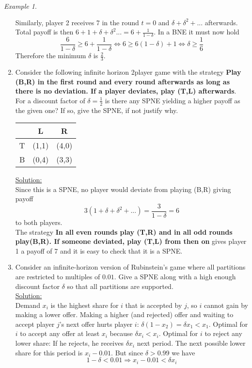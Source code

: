 \documentclass[a4paper, 12pt]{article}
\theoremstyle{plain}
\theoremstyle{definition}
\theoremstyle{lemma}
\theoremstyle{remark}
\theoremstyle{corollary}
\theoremstyle{example}
\newtheorem{example}[theorem]{Example}
\begin{document}
\begin{example}
\begin{enumerate}
			Similarly, player 2 receives 7 in the round $t=0$ and $\delta + \delta^2 + ...$ afterwards. Total payoff is then $6 + 1 + \delta + \delta^2 ... = 6 + \frac{1}{1-\delta}$. In a BNE it must now hold \[\frac{6}{1-\delta} \geq 6 + \frac{1}{1-\delta} \Leftrightarrow 6 \geq 6(1-\delta) + 1 \Leftrightarrow \delta \geq \frac{1}{6}\]
			Therefore the minimum $\delta$ is $\frac{2}{3}$.
			\item Consider the following infinite horizon 2player game with the strategy \textbf{Play (B,R) in the first round and every round afterwards as long as there is no deviation. If a player deviates, play (T,L) afterwards}. For a discount factor of $\delta = \frac{1}{2}$ is there any SPNE yielding a higher payoff as the given one? If so, give the SPNE, if not justify why.
			\begin{center}
				\begin{table}[h]
					\centering
					\begin{tabular}{c|c|c|}
						& L & R\\
						\hline
						T & (1,1) & (4,0)\\
						\hline
						B & (0,4) & (3,3)\\
						\hline
					\end{tabular}
				\end{table}
			\end{center}
			\underline{Solution:}\\
			Since this is a SPNE, no player would deviate from playing (B,R) giving payoff \[3(1+\delta + \delta^2 + ...) = \frac{3}{1-\delta} = 6\] to both players.\\
			The strategy \textbf{In all even rounds play (T,R) and in all odd rounds play(B,R). If someone deviated, play (T,L) from then on} gives player 1 a payoff of 7 and it is easy to check that it is a SPNE.
			\item Consider an infinite-horizon version of Rubinstein's game where all partitions are restricted to multiples of $0.01$. Give a SPNE along with a high enough discount factor $\delta$ so that all partitions are supported.\\
			\underline{Solution:}\\
			Demand $x_i$ is the highest share for $i$ that is accepted by $j$, so $i$ cannot gain by making a lower offer. Making a higher (and rejected) offer and waiting to accept player $j$'s next offer hurts player $i$: $\delta(1-x_2) = \delta x_1 < x_1$. Optimal for $i$ to accept any offer at least $x_i$ because $\delta x_i < x_i$. Optimal for $i$ to reject any lower share: If he rejects, he receives $\delta x_i$ next period. The next possible lower share for this period is $x_i - 0.01$. But since $\delta > 0.99$ we have \[1-\delta < 0.01 \Rightarrow x_i - 0.01 < \delta x_i\]

\end{enumerate}
\end{example}
\end{document}
